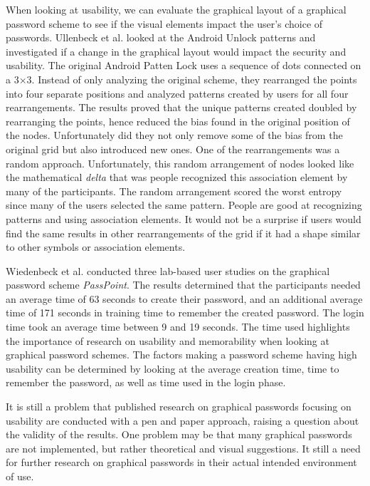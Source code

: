     When looking at usability, we can evaluate the graphical layout of a graphical password scheme to see if the visual elements impact the user's choice of passwords. Ullenbeck et al. \cite{Uellenbeck} looked at the Android Unlock patterns and investigated if a change in the graphical layout would impact the security and usability. The original Android Patten Lock uses a sequence of dots connected on a 3$\times$3. Instead of only analyzing the original scheme, they rearranged the points into four separate positions and analyzed patterns created by users for all four rearrangements. The results proved that the unique patterns created doubled by rearranging the points, hence reduced the bias found in the original position of the nodes. Unfortunately did they not only remove some of the bias from the original grid but also introduced new ones. One of the rearrangements was a random approach. Unfortunately, this random arrangement of nodes looked like the mathematical {\it delta} that was people recognized this association element by many of the participants. The random arrangement scored the worst entropy since many of the users selected the same pattern. People are good at recognizing patterns and using association elements. It would not be a surprise if users would find the same results in other rearrangements of the grid if it had a shape similar to other symbols or association elements.

    Wiedenbeck et al. \cite{Wiedenbeck1, Wiedenbeck2, Wiedenbeck3} conducted three lab-based user studies on the graphical password scheme {\it PassPoint}. The results determined that the participants needed an average time of 63 seconds to create their password, and an additional average time of 171 seconds in training time to remember the created password. The login time took an average time between 9 and 19 seconds. The time used highlights the importance of research on usability and memorability when looking at graphical password schemes. The factors making a password scheme having high usability can be determined by looking at the average creation time, time to remember the password, as well as time used in the login phase. 

    It is still a problem that published research on graphical passwords focusing on usability are conducted with a pen and paper approach, raising a question about the validity of the results. One problem may be that many graphical passwords are not implemented, but rather theoretical and visual suggestions. It still a need for further research on graphical passwords in their actual intended environment of use.

